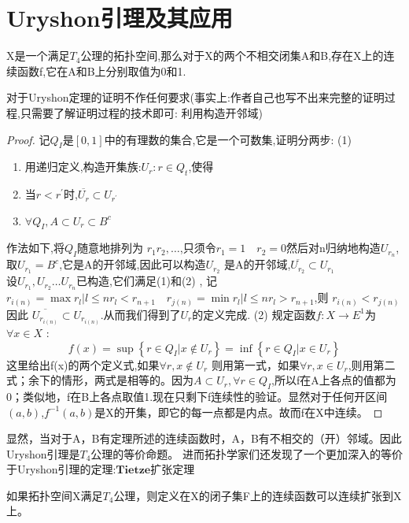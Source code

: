 \section{Uryshon引理及其应用}
\begin{theorem}[Uryshon引理]
    X是一个满足\(T_4\)公理的拓扑空间,那么对于X的两个不相交闭集A和B,存在X上的连续函数f,它在A和B上分别取值为0和1.
\end{theorem}
对于Uryshon定理的证明不作任何要求(事实上:作者自己也写不出来完整的证明过程,只需要了解证明过程的技术即可: 利用构造开邻域)
\begin{proof}
    记\(Q_I\)是\([ 0 ,1]\)中的有理数的集合,它是一个可数集,证明分两步:
    (1)
    \begin{enumerate}
        \item 用递归定义,构造开集族:\({ U_r : r \in Q_t } \),使得 \\
        \item 当\(r < r^{'}\)时,\(\overline{U_r}\subset U_{r^{'}}\) \\
        \item \(\forall Q_I , A \subset U_r \subset B^{c}\)
    \end{enumerate}
    作法如下,将\(Q_I\)随意地排列为 \({ r_1 r_2 ,\dots }\),只须令\(r_1 = 1 \quad r_2 = 0\)然后对n归纳地构造\(U_{r_n}\),取\(U_{r_1} = B^{c}\),它是A的开邻域,因此可以构造\(U_{r_2}\)
    是A的开邻域,\(\overline{U_{r_2}} \subset U_{r_1}\) \\
    设\(U_{r_1},U_{r_2} \dots U_{r_n}\)已构造,它们满足(1)和(2) , 记\(r_{i(n)}= \max { r_l | l \leq n r_l < r_{n+1} } \quad r_{j(n)}= \min  { r_l | l \leq n r_l > r_{n+1} } \),则 \(r_{i(n)} <r_{j(n)} \) 因此 \(\overline{U_{r_{i(n)}}} \subset U_{r_{i(n)}}\).从而我们得到了\({ U_r }\)的定义完成.
    (2) 规定函数\(f: X \rightarrow E^1\)为 \(\forall x \in X \) :
    \[f(x) = \sup \left\{r \in Q_I | x \notin U_r \right\} = \inf \left\{ r \in Q_I | x \in U_r \right\}\]
    这里给出f(x)的两个定义式,如果\(\forall r ,x \notin U_r\)  则用第一式，如果\(\forall r,x \in U_r\),则用第二式；余下的情形，两式是相等的。因为\(A \subset U_r , \forall r \in Q_I\),所以f在A上各点的值都为0；类似地，f在B上各点取值1.现在只剩下f连续性的验证。显然对于任何开区间\((a,b)\),\(f^{-1}(a,b)\)是X的开集，即它的每一点都是内点。故而f在X中连续。
    \end{proof}
    显然，当对于A，B有定理所述的连续函数时，A，B有不相交的（开）邻域。因此Uryshon引理是\(T_4\)公理的等价命题。
    进而拓扑学家们还发现了一个更加深入的等价于Uryshon引理的定理:\(\textbf{Tietze扩张定理}\)  
    \begin{theorem}[Tietze扩张定理]
    如果拓扑空间X满足\(T_4\)公理，则定义在X的闭子集F上的连续函数可以连续扩张到X上。
    \end{theorem}
